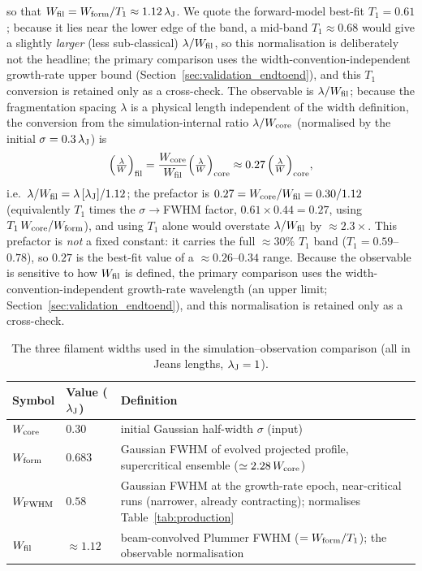 \documentclass[usenatbib,twoside,twocolumn]{mnras}
\begin{document}
so that $W_{\rm fil}=W_{\rm form}/T_1\approx1.12\,\lambda_{\rm J}$. We quote the forward-model best-fit $T_1=0.61$; because it lies near the lower edge of the band, a mid-band $T_1\approx0.68$ would give a slightly \emph{larger} (less sub-classical) $\lambda/W_{\rm fil}$, so this normalisation is deliberately not the headline; the primary comparison uses the width-convention-independent growth-rate upper bound (Section~\ref{sec:validation_endtoend}), and this $T_1$ conversion is retained only as a cross-check. The observable is $\lambda/W_{\rm fil}$; because the fragmentation spacing $\lambda$ is a physical length independent of the width definition, the conversion from the simulation-internal ratio $\lambda/W_{\rm core}$ (normalised by the initial $\sigma=0.3\,\lambda_{\rm J}$) is
\begin{equation}
\Big(\tfrac{\lambda}{W}\Big)_{\rm fil} = \frac{W_{\rm core}}{W_{\rm fil}}\Big(\tfrac{\lambda}{W}\Big)_{\rm core} \approx 0.27\,\Big(\tfrac{\lambda}{W}\Big)_{\rm core},
\label{eq:t1_apply}
\end{equation}
i.e.\ $\lambda/W_{\rm fil}=\lambda\,[\lambda_{\rm J}]/1.12$; the prefactor is $0.27=W_{\rm core}/W_{\rm fil}=0.30/1.12$ (equivalently $T_1$ times the $\sigma\!\to\!$FWHM factor, $0.61\times0.44=0.27$, using $T_1\,W_{\rm core}/W_{\rm form}$), and using $T_1$ alone would overstate $\lambda/W_{\rm fil}$ by $\approx2.3\times$. This prefactor is \emph{not} a fixed constant: it carries the full $\approx30\%$ $T_1$ band ($T_1=0.59$--$0.78$), so $0.27$ is the best-fit value of a $\approx0.26$--$0.34$ range. Because the observable is sensitive to how $W_{\rm fil}$ is defined, the primary comparison uses the width-convention-independent growth-rate wavelength (an upper limit; Section~\ref{sec:validation_endtoend}), and this normalisation is retained only as a cross-check.

\begin{table}
\caption{The three filament widths used in the simulation--observation comparison (all in Jeans lengths, $\lambda_{\rm J}=1$).}
\label{tab:widthdefs}
\footnotesize
\setlength{\tabcolsep}{3pt}
\begin{tabular}{p{1.5cm}p{1.4cm}p{4.0cm}}
\toprule
Symbol & Value ($\lambda_{\rm J}$) & Definition \\
\midrule
$W_{\rm core}$ & $0.30$ & initial Gaussian half-width $\sigma$ (input) \\
$W_{\rm form}$ & $0.683$ & Gaussian FWHM of evolved projected profile, supercritical ensemble ($\simeq2.28\,W_{\rm core}$) \\
$W_{\rm FWHM}$ & $0.58$ & Gaussian FWHM at the growth-rate epoch, near-critical runs (narrower, already contracting); normalises Table~\ref{tab:production} \\
$W_{\rm fil}$ & $\approx1.12$ & beam-convolved Plummer FWHM ($=W_{\rm form}/T_1$); the observable normalisation \\
\bottomrule
\end{tabular}
\end{table}
\end{document}
